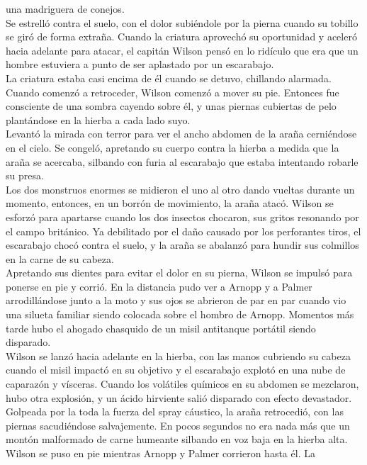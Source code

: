 una madriguera de conejos.\\
Se estrelló contra el suelo, con el dolor subiéndole por la pierna
cuando su tobillo se giró de forma extraña. Cuando la criatura aprovechó
su oportunidad y aceleró hacia adelante para atacar, el capitán Wilson
pensó en lo ridículo que era que un hombre estuviera a punto de ser
aplastado por un escarabajo.\\
La criatura estaba casi encima de él cuando se detuvo, chillando
alarmada. Cuando comenzó a retroceder, Wilson comenzó a mover su pie.
Entonces fue consciente de una sombra cayendo sobre él, y unas piernas
cubiertas de pelo plantándose en la hierba a cada lado suyo.\\
Levantó la mirada con terror para ver el ancho abdomen de la araña
cerniéndose en el cielo. Se congeló, apretando su cuerpo contra la
hierba a medida que la araña se acercaba, silbando con furia al
escarabajo que estaba intentando robarle su presa.\\
Los dos monstruos enormes se midieron el uno al otro dando vueltas
durante un momento, entonces, en un borrón de movimiento, la araña
atacó. Wilson se esforzó para apartarse cuando los dos insectos
chocaron, sus gritos resonando por el campo británico. Ya debilitado por
el daño causado por los perforantes tiros, el escarabajo chocó contra el
suelo, y la araña se abalanzó para hundir sus colmillos en la carne de
su cabeza.\\
Apretando sus dientes para evitar el dolor en su pierna, Wilson se
impulsó para ponerse en pie y corrió. En la distancia pudo ver a Arnopp
y a Palmer arrodillándose junto a la moto y sus ojos se abrieron de par
en par cuando vio una silueta familiar siendo colocada sobre el hombro
de Arnopp. Momentos más tarde hubo el ahogado chasquido de un misil
antitanque portátil siendo disparado.\\
Wilson se lanzó hacia adelante en la hierba, con las manos cubriendo su
cabeza cuando el misil impactó en su objetivo y el escarabajo explotó en
una nube de caparazón y vísceras. Cuando los volátiles químicos en su
abdomen se mezclaron, hubo otra explosión, y un ácido hirviente salió
disparado con efecto devastador.\\
Golpeada por la toda la fuerza del spray cáustico, la araña retrocedió,
con las piernas sacudiéndose salvajemente. En pocos segundos no era nada
más que un montón malformado de carne humeante silbando en voz baja en
la hierba alta.\\
Wilson se puso en pie mientras Arnopp y Palmer corrieron hasta él. La
